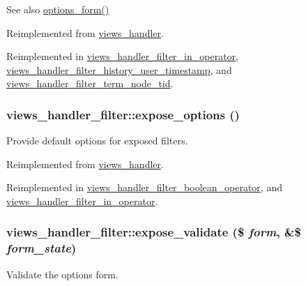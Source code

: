 \begin{DoxySeeAlso}{See also}
\hyperlink{classviews__handler__filter_af14c69367162057a32709a6340de0988}{options\_\-form()} 
\end{DoxySeeAlso}


Reimplemented from \hyperlink{classviews__handler_af462ac68a6853bed2a537a7fb908d807}{views\_\-handler}.

Reimplemented in \hyperlink{classviews__handler__filter__in__operator_a23bfbd98ea5838480365b21e952bf9f4}{views\_\-handler\_\-filter\_\-in\_\-operator}, \hyperlink{classviews__handler__filter__history__user__timestamp_a1977bbf7abbeaf89266ae9a7057c7cd7}{views\_\-handler\_\-filter\_\-history\_\-user\_\-timestamp}, and \hyperlink{classviews__handler__filter__term__node__tid_abf972bb53512f371af5c1ec32048f686}{views\_\-handler\_\-filter\_\-term\_\-node\_\-tid}.\hypertarget{classviews__handler__filter_a07ab6afc47bf892fb5fd5934c3f1d64c}{
\subsubsection[{expose\_\-options}]{\setlength{\rightskip}{0pt plus 5cm}views\_\-handler\_\-filter::expose\_\-options ()}}
\label{classviews__handler__filter_a07ab6afc47bf892fb5fd5934c3f1d64c}
Provide default options for exposed filters. 

Reimplemented from \hyperlink{classviews__handler_a2db9f3127a5364b17fb775cede2f43a6}{views\_\-handler}.

Reimplemented in \hyperlink{classviews__handler__filter__boolean__operator_a24ff1f565f02838bc2a63939ab510d89}{views\_\-handler\_\-filter\_\-boolean\_\-operator}, and \hyperlink{classviews__handler__filter__in__operator_a0ed328117721ce41a3744f0339c16527}{views\_\-handler\_\-filter\_\-in\_\-operator}.\hypertarget{classviews__handler__filter_a30b7f718c7c152dfedb3fc444bd1304c}{
\subsubsection[{expose\_\-validate}]{\setlength{\rightskip}{0pt plus 5cm}views\_\-handler\_\-filter::expose\_\-validate (\$ {\em form}, \/  \&\$ {\em form\_\-state})}}
\label{classviews__handler__filter_a30b7f718c7c152dfedb3fc444bd1304c}
Validate the options form. 

